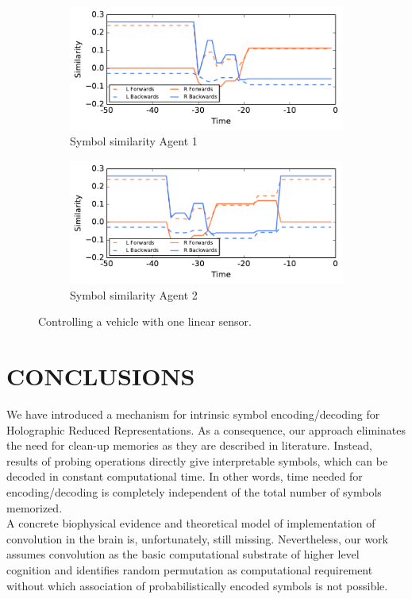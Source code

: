 \documentclass[a4paper,twoside]{article}
\begin{document}
\begin{figure}
\begin{subfigure}{.49\columnwidth}
	\includegraphics[width=.98\columnwidth]{img/2_139.pdf}
	\caption{Symbol similarity Agent 1}
	\label{fig:experiment:similar1}
\end{subfigure}
\begin{subfigure}{.49\columnwidth}
	\center
	\includegraphics[width=.98\columnwidth]{img/2_235.pdf}
	\caption{Symbol similarity Agent 2}
	\label{fig:experiment:similar2}
\end{subfigure}
\caption{Controlling a vehicle with one linear sensor.}
\label{fig:experiment}
\end{figure}

	\section{CONCLUSIONS}
	We have introduced a mechanism for intrinsic symbol encoding/decoding for Holographic Reduced Representations.
As a consequence, our approach eliminates the need for clean-up memories as they are described in literature.
Instead, results of probing operations directly give interpretable symbols, which can be decoded in constant computational time.
In other words, time needed for encoding/decoding is completely independent of the total number of symbols memorized.\\
	A concrete biophysical evidence and theoretical model of implementation of convolution in the brain is, unfortunately, still missing. Nevertheless, our work assumes convolution as the basic computational substrate of higher level cognition and identifies random permutation as computational requirement without which association of probabilistically encoded symbols is not possible.
	
\end{document}
